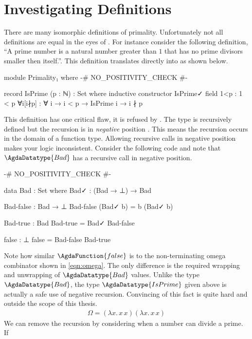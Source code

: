 \documentclass[./Thesis.tex]{subfiles}
\begin{document}
\section{Investigating Definitions}
\label{sec:investigating-definitions}
There are many isomorphic definitions of primality. Unfortunately not all
definitions are equal in the eyes of \Agda{}. For instance consider the
following definition, ``A prime number is a natural number greater than $1$ that
has no prime divisors smaller then itself.''. This definition translates
directly into \Agda{} as shown below.
\begin{code}[hide]
  module Primality₁ where
    {-# NO_POSITIVITY_CHECK #-}
\end{code}
\begin{code}
    record IsPrime (p : ℕ) : Set where
      inductive
      constructor IsPrime✓
      field
        1<p : 1 < p
        ∀i[i∤p] : ∀ {i} → i < p → IsPrime i → i ∤ p
\end{code}
This definition has one critical flaw, it is refused by \Agda{}. The type is
recursively defined but the recursion is in \textit{negative} position
\cite{harper}. This means the recursion occurs in the domain of a function type.
Allowing recursive calls in negative position makes your logic inconsistent.
Consider the following code and note that $\AgdaDatatype{Bad}$ has a recursive
call in negative position.
\begin{code}[hide]
  {-# NO_POSITIVITY_CHECK #-}
\end{code}
\begin{code}
  data Bad : Set where
    Bad✓ : (Bad → ⊥) → Bad

  Bad-false : Bad → ⊥
  Bad-false (Bad✓ b) = b (Bad✓ b)

  Bad-true : Bad
  Bad-true = Bad✓ Bad-false

  false : ⊥
  false = Bad-false Bad-true
\end{code}
Note how similar $\AgdaFunction{false}$ is to the non-terminating omega
combinator shown in \ref{eqn:omega}. The only difference is the required
wrapping and unwrapping of $\AgdaDatatype{Bad}$ values. Unlike the type
$\AgdaDatatype{Bad}$, the type $\AgdaDatatype{IsPrime}$ given above is actually a safe
use of negative recursion. Convincing \Agda{} of this fact is quite hard and
outside the scope of this thesis.
\begin{align}
  \label{eqn:omega}
  \Omega = (\lambda x. \, x \, x) (\lambda x. \, x \, x)
\end{align}
We can remove the recursion by considering when a number can divide a prime. If
\end{document}
